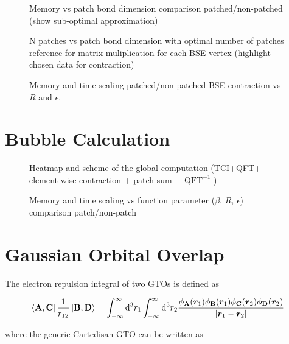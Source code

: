 \begin{figure}[ht!]
    \caption{Memory vs patch bond dimension comparison patched/non-patched (show sub-optimal approximation)}
\end{figure}

\begin{figure}[ht!]
    \caption{N patches vs patch bond dimension with optimal number of patches reference for matrix muliplication for each BSE vertex (highlight chosen data for contraction)}
\end{figure}

\begin{figure}[ht!]
    \caption{Memory and time scaling patched/non-patched BSE contraction vs $R$ and $\epsilon$.}
\end{figure}

\section{Bubble Calculation}

\begin{figure}[ht!]
    \caption{Heatmap and scheme of the global computation (TCI+QFT+ element-wise contraction + patch sum + $\textrm{QFT}^{-1}$ )}
\end{figure}

\begin{figure}[ht!]
    \caption{Memory and time scaling vs function parameter ($\beta$, $R$, $\epsilon$) comparison patch/non-patch }
\end{figure}


\section{Gaussian Orbital Overlap}


The electron repulsion integral of two GTOs is defined as

\begin{equation}
    \bra{\textbf{A}, \textbf{C}}\frac{1}{r_{12}}\ket{\textbf{B}, \textbf{D}} = \int_{-\infty}^\infty \text{d}^3r_1 \int_{-\infty}^\infty \text{d}^3r_2 \frac{\phi_\textbf{A}(\bm{r}_1) \phi_\textbf{B}(\bm{r}_1) \phi_\textbf{C}(\bm{r}_2) \phi_\textbf{D}(\bm{r}_2)}{|\bm{r}_1 - \bm{r}_2|}
\end{equation}

where the generic Cartedisan GTO can be written as

